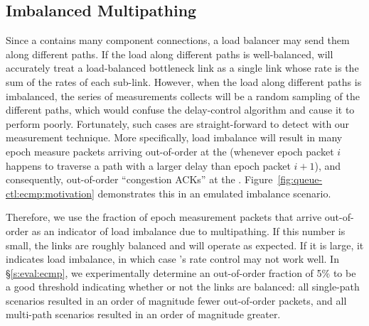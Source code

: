 \subsection{Imbalanced Multipathing}\label{s:queue-ctl:ecmp}
Since a \bundle contains many component connections, a load balancer may send them along different paths. If the load along different paths is well-balanced, \name will accurately treat a load-balanced bottleneck link as a single link whose rate is the sum of the rates of each sub-link. However, when the load along different paths is imbalanced, the series of measurements \name collects will be a random sampling of the different paths, which would confuse the delay-control algorithm and cause it to perform poorly. Fortunately, such cases are straight-forward to detect with our measurement technique. 
More specifically, load imbalance will result in many epoch measure packets arriving out-of-order at the \outbox (whenever epoch packet $i$ happens to traverse a path with a larger delay than epoch packet $i+1$), and consequently, out-of-order ``congestion ACKs'' at the \inbox.  Figure~\ref{fig:queue-ctl:ecmp:motivation} demonstrates this in an emulated imbalance scenario. 

Therefore, we use the fraction of epoch measurement packets that arrive out-of-order as an indicator of load imbalance due to multipathing.
If this number is small, the links are roughly balanced and \name will operate as expected.
If it is large, it indicates load imbalance, in which case \name's rate control may not work well. 
In \S\ref{s:eval:ecmp}, we experimentally determine an out-of-order fraction of 5\% to be a good threshold indicating whether or not the links are balanced: all single-path scenarios resulted in an order of magnitude fewer out-of-order packets, and all multi-path scenarios resulted in an order of magnitude greater.

